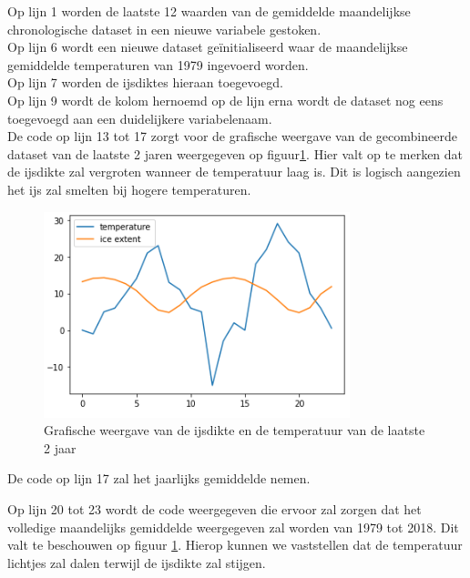 Op lijn 1 worden de laatste 12 waarden van de gemiddelde maandelijkse chronologische dataset in een nieuwe variabele gestoken. \\
Op lijn 6 wordt een nieuwe dataset ge\"{i}nitialiseerd waar de maandelijkse gemiddelde temperaturen van 1979 ingevoerd worden.\\
Op lijn 7 worden de ijsdiktes hieraan toegevoegd. \\
Op lijn 9 wordt de kolom hernoemd op de lijn erna wordt de dataset nog eens toegevoegd aan een duidelijkere variabelenaam. \\

De code op lijn 13 tot 17 zorgt voor de grafische weergave van de gecombineerde dataset van de laatste 2 jaren weergegeven op figuur\ref{fig:combinedlastyears}. Hier valt op te merken dat de ijsdikte zal vergroten wanneer de temperatuur laag is. Dit is logisch aangezien het ijs zal smelten bij hogere temperaturen. \\

\begin{figure}
    \centering
    \caption{Grafische weergave van de ijsdikte en de temperatuur van de laatste 2 jaar}
    \label{fig:combinedlastyears}
    \includegraphics[width=0.7\linewidth]{combined_last_years.PNG}
\end{figure}

De code op lijn 17 zal het jaarlijks gemiddelde nemen.

Op lijn 20 tot 23 wordt de code weergegeven die ervoor zal zorgen dat het volledige maandelijks gemiddelde weergegeven zal worden van 1979 tot 2018. Dit valt te beschouwen op figuur \ref{fig:combinedlastyears}. Hierop kunnen we vaststellen dat de temperatuur lichtjes zal dalen terwijl de ijsdikte zal stijgen.

